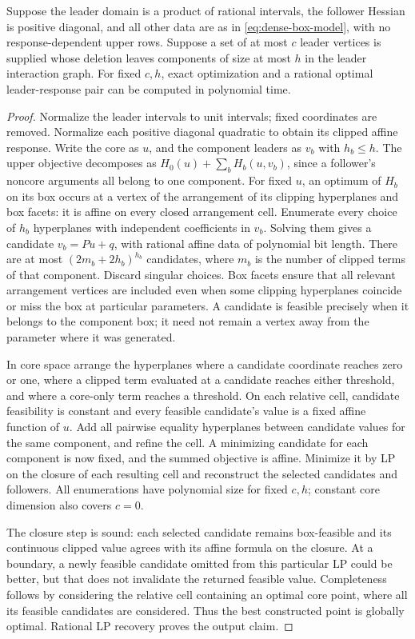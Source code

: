 \begin{theorem}\label{thm:leader-core}
Suppose the leader domain is a product of rational intervals, the follower
Hessian is positive diagonal, and all other data are as in
\eqref{eq:dense-box-model}, with no response-dependent upper rows. Suppose a
set of at most \(c\) leader vertices is supplied whose deletion leaves
components of size at most \(h\) in the leader interaction graph. For fixed
\(c,h\), exact optimization and a rational optimal leader-response pair can
be computed in polynomial time.
\end{theorem}
\begin{proof}
Normalize the leader intervals to unit intervals; fixed coordinates are removed.
Normalize each positive diagonal quadratic to obtain its clipped affine
response. Write the core as \(u\), and the component leaders as \(v_b\) with
\(h_b\le h\). The upper objective decomposes as
\(H_0(u)+\sum_bH_b(u,v_b)\), since a follower's noncore arguments all belong
to one component.
For fixed \(u\), an optimum of \(H_b\) on its box occurs at a vertex of the
arrangement of its clipping hyperplanes and box facets: it is affine on every
closed arrangement cell. Enumerate every choice of \(h_b\) hyperplanes with
independent coefficients in \(v_b\). Solving them gives a candidate
\(v_b=P u+q\), with rational affine data of polynomial bit length.
There are at most \((2m_b+2h_b)^{h_b}\) candidates, where \(m_b\) is the
number of clipped terms of that component. Discard singular choices. Box
facets ensure that all relevant arrangement vertices are included even when
some clipping hyperplanes coincide or miss the box at particular parameters.
A candidate is feasible precisely when it belongs to the component box; it
need not remain a vertex away from the parameter where it was generated.

In core space arrange the hyperplanes where a candidate coordinate reaches
zero or one, where a clipped term evaluated at a candidate reaches either
threshold, and where a core-only term reaches a threshold. On each relative
cell, candidate feasibility is constant and every feasible candidate's value is
a fixed affine function of \(u\). Add all pairwise equality hyperplanes between
candidate values for the same component, and refine the cell. A minimizing
candidate for each component is now fixed, and the summed objective is affine.
Minimize it by LP on the closure of each resulting cell and reconstruct the
selected candidates and followers. All enumerations have polynomial size for
fixed \(c,h\); constant core dimension also covers \(c=0\).

The closure step is sound: each selected candidate remains box-feasible and
its continuous clipped value agrees with its affine formula on the closure.
At a boundary, a newly feasible candidate omitted from this particular LP
could be better, but that does not invalidate the returned feasible value.
Completeness follows by considering the relative cell containing an optimal
core point, where all its feasible candidates are considered. Thus the best
constructed point is globally optimal. Rational LP recovery proves the output
claim.
\end{proof}
